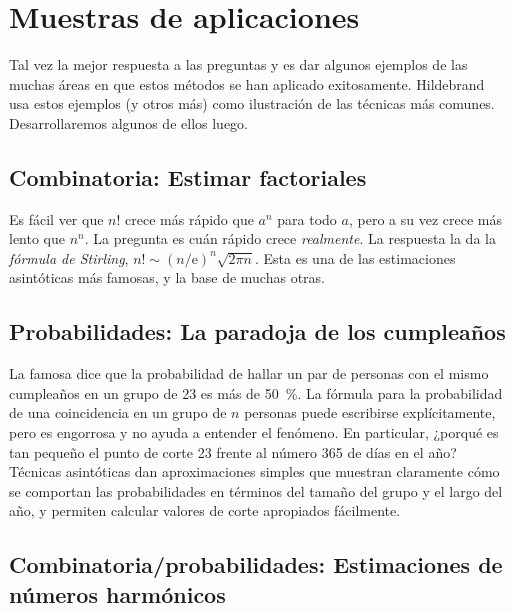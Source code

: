 \section{Muestras de aplicaciones}
\label{sec:aplications-asymptotics}

  Tal vez la mejor respuesta a las preguntas
  y 
  es dar algunos ejemplos de las muchas áreas
  en que estos métodos se han aplicado exitosamente.
  Hildebrand~%
    \cite{hildebrand15:_short_course_asymptotics}
  usa estos ejemplos
  (y otros más)
  como ilustración de las técnicas más comunes.
  Desarrollaremos algunos de ellos luego.

\subsection{Combinatoria:
                Estimar factoriales}
\label{sec:combinatorics:factorials}

  Es fácil ver que \(n!\) crece más rápido que \(a^n\) para todo \(a\),
  pero a su vez crece más lento que \(n^n\).
  La pregunta es cuán rápido crece \emph{realmente}.
  La respuesta la da la \emph{fórmula de Stirling},
  \(n! \sim (n / \mathrm{e})^n \sqrt{2 \pi n}\).
  Esta es una de las estimaciones asintóticas más famosas,
  y la base de muchas otras.

\subsection{Probabilidades:
                La paradoja de los cumpleaños}
\label{sec:probability:birthday-paradox}

  La famosa 
  dice que la probabilidad
  de hallar un par de personas con el mismo cumpleaños
  en un grupo de \num{23} es más de \SI{50}{\percent}.
  La fórmula para la probabilidad
  de una coincidencia en un grupo de \(n\) personas
  puede escribirse explícitamente,
  pero es engorrosa y no ayuda a entender el fenómeno.
  En particular,
  ¿porqué es tan pequeño el punto de corte \num{23}
  frente al número \num{365} de días en el año?
  Técnicas asintóticas dan aproximaciones simples
  que muestran claramente cómo se comportan las probabilidades
  en términos del tamaño del grupo y el largo del año,
  y permiten calcular valores de corte apropiados fácilmente.

\subsection{Combinatoria/probabilidades:
                Estimaciones de números harmónicos}
\label{sec:combinatorics:harmonic-numbers}

